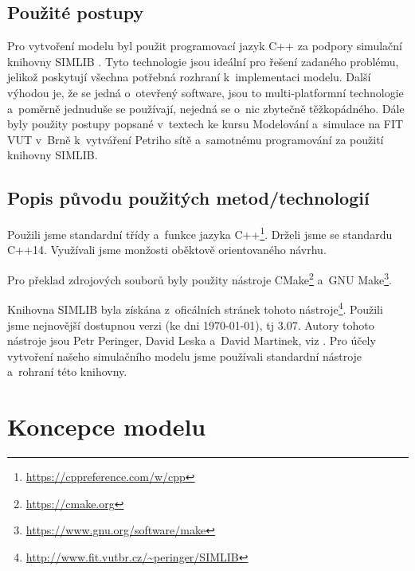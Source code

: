 \documentclass[a4paper, 11pt]{article}
\begin{document}
	\subsection{Použité postupy}

	Pro vytvoření modelu byl použit programovací jazyk C++ za podpory
	simulační knihovny SIMLIB \cite{SIMLIB}. Tyto technologie jsou ideální pro
	řešení zadaného problému, jelikož poskytují všechna potřebná rozhraní
	k~implementaci modelu. Další výhodou je, že se jedná o~otevřený software,
	jsou to multi-platformní technologie a~poměrně jednuduše se používají,
	nejedná se o~nic zbytečně těžkopádného. Dále byly použity postupy popsané
	v~textech ke kursu Modelování a~simulace na FIT VUT v~Brně \cite{IMS_slides}
	k~vytváření Petriho sítě \cite[snímek 123]{IMS_slides} a~samotnému
	programování za použití knihovny SIMLIB.


	\subsection{Popis původu použitých metod/technologií}

	Použili jsme standardní třídy a~funkce jazyka
	C++\footnote{\url{https://cppreference.com/w/cpp}}.
	Drželi jsme se standardu C++14. Využívali jsme monžosti oběktově
	orientovaného návrhu.

	Pro překlad zdrojových souborů byly použity nástroje
	CMake\footnote{\url{https://cmake.org}}
	a~GNU Make\footnote{\url{https://www.gnu.org/software/make}}.

	Knihovna SIMLIB byla získána z~oficálních stránek tohoto
	nástroje\footnote{\url{http://www.fit.vutbr.cz/~peringer/SIMLIB}}.
	Použili jsme nejnovější dostupnou verzi (ke dni \today), tj 3.07.
	Autory tohoto nástroje jsou Petr Peringer, David Leska a~David Martinek,
	viz \cite{SIMLIB}. Pro účely vytvoření našeho simulačního modelu
	\cite[snímek 44]{IMS_slides} jsme používali standardní nástroje
	a~rohraní této knihovny.



	\section{Koncepce modelu}
\end{document}
